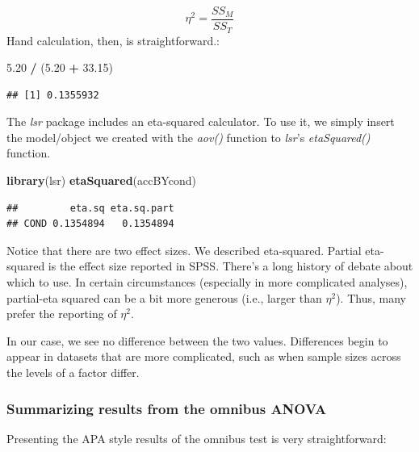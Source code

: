 \documentclass[
  english,
]{book}
\newenvironment{Shaded}{\begin{snugshade}}{\end{snugshade}}
\newcommand{\FloatTok}[1]{\textcolor[rgb]{0.00,0.00,0.81}{#1}}
\newcommand{\KeywordTok}[1]{\textcolor[rgb]{0.13,0.29,0.53}{\textbf{#1}}}
\newcommand{\NormalTok}[1]{#1}
\newcommand{\OperatorTok}[1]{\textcolor[rgb]{0.81,0.36,0.00}{\textbf{#1}}}
\newcommand{\StringTok}[1]{\textcolor[rgb]{0.31,0.60,0.02}{#1}}
\begin{document}
\[\eta ^{2}=\frac{SS_{M}}{SS_{T}}\]
Hand calculation, then, is straightforward.:

\begin{Shaded}
\begin{Highlighting}[]
\FloatTok{5.20} \OperatorTok{/}\StringTok{ }\NormalTok{(}\FloatTok{5.20} \OperatorTok{+}\StringTok{ }\FloatTok{33.15}\NormalTok{)}
\end{Highlighting}
\end{Shaded}

\begin{verbatim}
## [1] 0.1355932
\end{verbatim}

The \emph{lsr} package includes an eta-squared calculator. To use it, we simply insert the model/object we created with the \emph{aov()} function to \emph{lsr}'s \emph{etaSquared()} function.

\begin{Shaded}
\begin{Highlighting}[]
\KeywordTok{library}\NormalTok{(lsr)}
\KeywordTok{etaSquared}\NormalTok{(accBYcond)}
\end{Highlighting}
\end{Shaded}

\begin{verbatim}
##         eta.sq eta.sq.part
## COND 0.1354894   0.1354894
\end{verbatim}

Notice that there are two effect sizes. We described eta-squared. Partial eta-squared is the effect size reported in SPSS. There's a long history of debate about which to use. In certain circumstances (especially in more complicated analyses), partial-eta squared can be a bit more generous (i.e., larger than \(\eta^2\)). Thus, many prefer the reporting of \(\eta^2\).

In our case, we see no difference between the two values. Differences begin to appear in datasets that are more complicated, such as when sample sizes across the levels of a factor differ.

\hypertarget{summarizing-results-from-the-omnibus-anova}{%
\subsubsection{Summarizing results from the omnibus ANOVA}\label{summarizing-results-from-the-omnibus-anova}}

Presenting the APA style results of the omnibus test is very straightforward:
\end{document}
